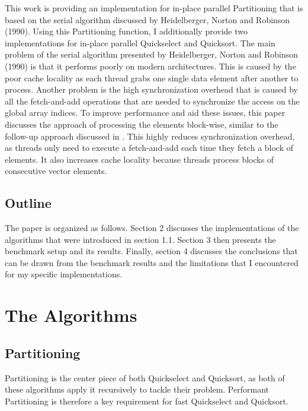\documentclass[sigconf]{acmart}
\begin{document}
This work is providing an implementation for in-place parallel Partitioning that is based on the serial algorithm discussed by Heidelberger, Norton and Robinson (1990). Using this Partitioning function, I additionally provide two implementations for in-place parallel Quickselect and Quicksort. The main problem of the serial algorithm presented by Heidelberger, Norton and Robinson (1990) is that it performs poorly on modern architectures. This is caused by the poor cache locality as each thread grabs one single data element after another to process. Another problem is the high synchronization overhead that is caused by all the fetch-and-add operations that are needed to synchronize the access on the global array indices. To improve performance and aid these issues, this paper discusses the approach of processing the elements block-wise, similar to the follow-up approach discussed in \cite{heidelberger1990}. This highly reduces synchronization overhead, as threads only need to execute a fetch-and-add each time they fetch a block of elements. It also increases cache locality because threads process blocks of consecutive vector elements.

\subsection{Outline}

The paper is organized as follows. Section 2 discusses the implementations of the algorithms that were introduced in section 1.1. Section 3 then presents the benchmark setup and its results. Finally, section 4 discusses the conclusions that can be drawn from the benchmark results and the limitations that I encountered for my specific implementations.

\section{The Algorithms}

\subsection{Partitioning}
\label{sub:sec:Partitioning}

Partitioning is the center piece of both Quickselect and Quicksort, as both of these algorithms apply it recursively to tackle their problem. Performant Partitioning is therefore a key requirement for fast Quickselect and Quicksort.
\end{document}
